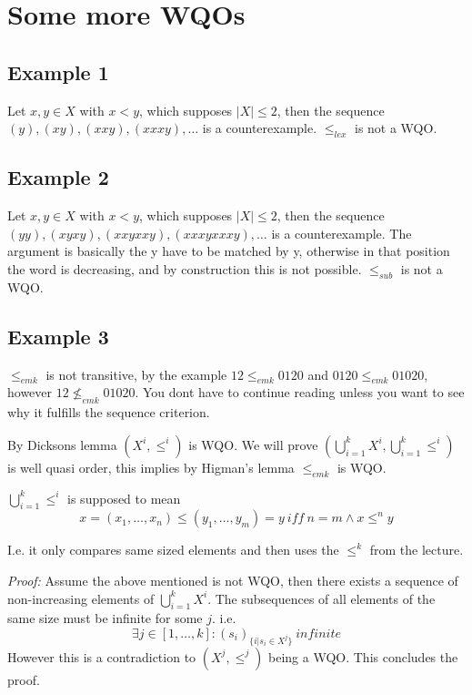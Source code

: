 \section{Some more WQOs}

\subsection{Example 1}

Let $x,y \in X$ with $x < y$, which supposes $|X| \leq 2$, then the sequence $(y),(xy),(xxy),(xxxy), \dots$ is a counterexample. $\leq_{lex}$ is not a WQO.

\subsection{Example 2}

Let $x,y \in X$ with $x < y$, which supposes $|X| \leq 2$, then the sequence $(yy),(xyxy),(xxyxxy),(xxxyxxxy),\dots$ is a counterexample. The argument is basically the y have to be matched by y, otherwise in that position the word is decreasing, and by construction this is not possible. $\leq_{sub}$ is not a WQO.

\subsection{Example 3}

$\leq_{emk}$ is not transitive, by the example $12 \leq_{emk} 0120$ and $0120 \leq_{emk} 01020$, however $12 \not\leq_{emk} 01020$. You dont have to continue reading unless you want to see why it fulfills the sequence criterion.

By Dicksons lemma $(X^i,\leq^i)$ is WQO. We will prove $(\bigcup_{i=1}^k X^i,\bigcup_{i=1}^k \leq^i)$ is well quasi order, this implies by Higman's lemma $\leq_{emk}$ is WQO.

$\bigcup_{i=1}^k \leq^i$ is supposed to mean \[x=(x_1,\dots,x_n) \leq (y_1,\dots,y_m)=y~\textit{iff}~n=m \wedge x \leq^n y\]

I.e. it only compares same sized elements and then uses the $\leq^k$ from the lecture. 

\textit{Proof:} Assume the above mentioned is not WQO, then there exists a sequence of non-increasing elements of $\bigcup_{i=1}^k X^i$. The subsequences of all elements of the same size must be infinite for some $j$. i.e. \[\exists j \in [1,\dots,k]:(s_i)_{\{i|s_i\in X^j\}}~\textit{infinite}\] However this is a contradiction to $(X^j,\leq^j)$ being a WQO. This concludes the proof.

